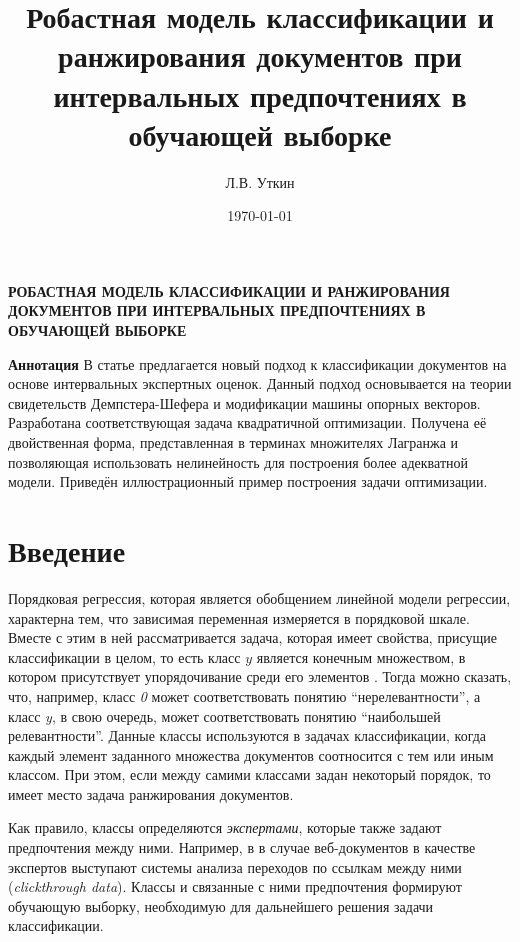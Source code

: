 \documentclass[12pt,a4paper,oneside]{article}
\title{Робастная модель классификации и ранжирования документов при интервальных предпочтениях в обучающей выборке}
\author{Л.В. Уткин}
\date{\today}
\begin{document}

\ApplyCommonPageStyle


\begin{center}
\textbf{\large РОБАСТНАЯ МОДЕЛЬ КЛАССИФИКАЦИИ И РАНЖИРОВАНИЯ ДОКУМЕНТОВ ПРИ ИНТЕРВАЛЬНЫХ ПРЕДПОЧТЕНИЯХ В ОБУЧАЮЩЕЙ ВЫБОРКЕ}
\end{center}
\vspace{2em}
{\footnotesize %
\textbf{Аннотация} В статье предлагается новый подход к классификации документов на основе интервальных экспертных оценок. 
Данный подход основывается на теории свидетельств Демпстера-Шефера и модификации машины опорных векторов. 
Разработана соответствующая задача квадратичной оптимизации. 
Получена её двойственная форма, представленная в терминах множителях Лагранжа и позволяющая использовать нелинейность для построения более адекватной модели. 
Приведён иллюстрационный пример построения задачи оптимизации. 
%
}


\section{Введение}
\label{sec:introduction}

\par
Порядковая регрессия, которая является обобщением линейной модели регрессии, характерна тем, что зависимая переменная измеряется в порядковой шкале. 
Вместе с этим в ней рассматривается задача, которая имеет свойства, присущие классификации в целом, то есть класс $y$ является конечным множеством, в котором присутствует упорядочивание среди его элементов .
Тогда можно сказать, что, например, класс \emph{0} может соответствовать понятию ``нерелевантности'', а класс \emph{y}, в свою очередь, может соответствовать понятию ``наибольшей релевантности''. 
Данные классы используются в задачах классификации, когда каждый элемент заданного множества документов соотносится с тем или иным классом. 
При этом, если между самими классами задан некоторый порядок, то имеет место задача ранжирования документов. 

\par
Как правило, классы определяются \emph{экспертами}, которые также задают предпочтения между ними. 
Например, в в случае веб-документов в качестве экспертов выступают системы анализа переходов по ссылкам между ними (\emph{clickthrough data}). 
Классы и связанные с ними предпочтения формируют обучающую выборку, необходимую для дальнейшего решения задачи классификации. 
\end{document}
